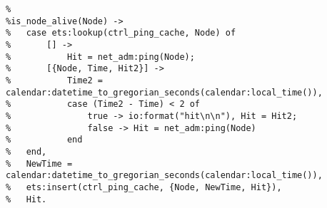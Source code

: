 \begin{lstlisting}
%	
%is_node_alive(Node) -> 
%	case ets:lookup(ctrl_ping_cache, Node) of		
%		[] -> 		
%			Hit = net_adm:ping(Node);
%		[{Node, Time, Hit2}] -> 		
%			Time2 = calendar:datetime_to_gregorian_seconds(calendar:local_time()),			
%			case (Time2 - Time) < 2 of		
%				true -> io:format("hit\n\n"), Hit = Hit2;
%				false -> Hit = net_adm:ping(Node)
%			end		
%	end,		
%	NewTime = calendar:datetime_to_gregorian_seconds(calendar:local_time()),		
%	ets:insert(ctrl_ping_cache, {Node, NewTime, Hit}),
%	Hit.
	


\end{lstlisting}
